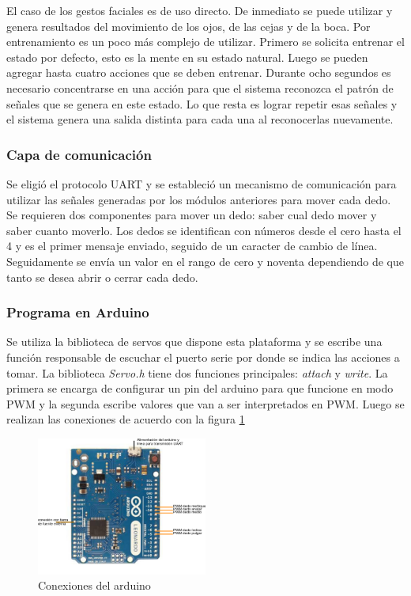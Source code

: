 \documentclass[letterpaper,journal,transmag]{IEEEtran}
\begin{document}
El caso de los gestos faciales es de uso directo. De inmediato se puede
utilizar y genera resultados del movimiento de los ojos, de las
cejas y de la boca. Por entrenamiento es un poco más complejo de utilizar.
Primero se solicita entrenar el estado por defecto, esto es la mente en su
estado natural. Luego se pueden agregar hasta cuatro acciones que se deben
entrenar. Durante ocho segundos es necesario concentrarse en una acción para
que el sistema reconozca el patrón de señales que se genera en este estado. Lo
que resta es lograr repetir esas señales y el sistema genera una salida
distinta para cada una al reconocerlas nuevamente.\\

\subsubsection{Capa de comunicación}
Se eligió el protocolo UART y se estableció un mecanismo de comunicación para
utilizar las señales generadas por los módulos anteriores para mover cada dedo.
Se requieren dos componentes para mover un dedo: saber cual dedo mover y saber
cuanto moverlo. Los dedos se identifican con números desde el cero hasta el 4 y
es el primer mensaje enviado, seguido de un caracter de cambio de línea.
Seguidamente se envía un valor en el rango de cero y noventa dependiendo de que
tanto se desea abrir o cerrar cada dedo.\\

\subsubsection{Programa en Arduino}
Se utiliza la biblioteca de servos que dispone esta plataforma y se escribe una
función responsable de escuchar el puerto serie por donde se indica las
acciones a tomar. La biblioteca \emph{Servo.h} tiene dos funciones principales:
\emph{attach} y \emph{write}. La primera se encarga de configurar un pin del
arduino para que funcione en modo PWM y la segunda escribe valores que van a
ser interpretados en PWM. Luego se realizan las conexiones de acuerdo con la
figura \ref{fig:arduino}\\
      \begin{figure}[ht]
         \includegraphics[width=0.5\textwidth]{arduino}
         \caption{Conexiones del arduino}
         \label{fig:arduino}
      \end{figure}
\end{document}
